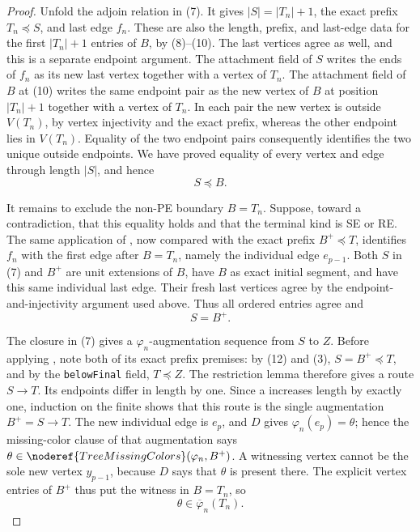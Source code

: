\begin{proof}
Unfold the adjoin relation in (7).  It gives \(|S|=|T_n|+1\), the exact
prefix \(T_n\preccurlyeq S\), and last edge \(f_n\).  These are also the
length, prefix, and last-edge data for the first \(|T_n|+1\) entries of
\(B\), by (8)--(10).  The last vertices agree as well, and this is a
separate endpoint argument.  The attachment field of \(S\) writes the
ends of \(f_n\) as its new last vertex together with a vertex of \(T_n\).
The attachment field of \(B\) at (10) writes the same endpoint pair as
the new vertex of \(B\) at position \(|T_n|+1\) together with a vertex of
\(T_n\).  In each pair the new vertex is outside \(V(T_n)\), by vertex
injectivity and the exact prefix, whereas the other endpoint lies in
\(V(T_n)\).  Equality of the two endpoint pairs consequently identifies
the two unique outside endpoints.  We have proved equality of every
vertex and edge through length \(|S|\), and hence
\[
                         S\preccurlyeq B.                     \tag{11}
\]

It remains to exclude the non-PE boundary \(B=T_n\).  Suppose, toward a
contradiction, that this equality holds and that the terminal kind is SE
or RE.  The same application of
, now compared with the exact
prefix \(B^+\preccurlyeq T\), identifies \(f_n\) with the first edge
after \(B=T_n\), namely the individual edge \(e_{p-1}\).  Both \(S\) in
(7) and \(B^+\) are unit extensions of \(B\), have \(B\) as exact initial
segment, and have this same individual last edge.  Their fresh last
vertices agree by the endpoint-and-injectivity argument used above.
Thus all ordered entries agree and
\[
                              S=B^+.                          \tag{12}
\]

The closure in (7) gives a \(\varphi_n\)-augmentation sequence from \(S\)
to \(Z\).  Before applying
, note both of its exact
prefix premises: by (12) and (3), \(S=B^+\preccurlyeq T\), and by the
\texttt{belowFinal} field, \(T\preccurlyeq Z\).  The restriction lemma
therefore gives a route \(S\longrightarrow T\).  Its endpoints differ in
length by one.  Since a  increases length
by exactly one, induction on the finite
 shows that this route is the
single augmentation \(B^+=S\longrightarrow T\).  The new individual edge
is \(e_p\), and \(D\) gives \(\varphi_n(e_p)=\theta\); hence the
missing-color clause of that augmentation says
\(\theta\in\noderef{TreeMissingColors}(\varphi_n,B^+)\).  A witnessing
vertex cannot be the sole new vertex \(y_{p-1}\), because \(D\) says that
\(\theta\) is present there.  The explicit vertex entries of \(B^+\) thus
put the witness in \(B=T_n\), so
\[
                 \theta\in\overline\varphi_n(T_n).           \tag{13}
\]


\end{proof}
